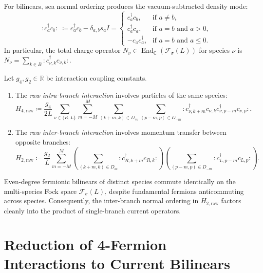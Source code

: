 For bilinears, sea normal ordering produces the vacuum-subtracted density mode:
\begin{equation}
:\! c_a^\dagger c_b \!: \;\coloneqq c_a^\dagger c_b - \delta_{a, b} s_a I = \begin{cases} c_a^\dagger c_b, & \text{if } a \neq b, \\ c_a^\dagger c_a, & \text{if } a = b \text{ and } a > 0, \\ - c_a c_a^\dagger, & \text{if } a = b \text{ and } a \le 0. \end{cases}
\end{equation}
In particular, the total charge operator $N_\nu \in \operatorname{End}_{\mathbb{C}}(\mathcal{F}_\sigma(L))$ for species $\nu$ is $N_\nu = \sum_{k \in B} :\! c_{\nu, k}^\dagger c_{\nu, k} \!:$.

\begin{definition}
Let $g_4, g_2 \in \mathbb{R}$ be interaction coupling constants.
\begin{enumerate}
    \item The \emph{raw intra-branch interaction} involves particles of the same species:
    \begin{equation}
    H_{4, \mathrm{raw}} \coloneqq \frac{g_4}{2L} \sum_{\nu \in \{R, L\}} \sum_{m=-M}^M \sum_{(k+m, k) \in D_m} \sum_{(p-m, p) \in D_{-m}} :\! c_{\nu, k+m}^\dagger c_{\nu, k} c_{\nu, p-m}^\dagger c_{\nu, p} \!:.
    \end{equation}
    \item The \emph{raw inter-branch interaction} involves momentum transfer between opposite branches:
    \begin{equation}
    H_{2, \mathrm{raw}} \coloneqq \frac{g_2}{L} \sum_{m=-M}^M \left( \sum_{(k+m, k) \in D_m} :\! c_{R, k+m}^\dagger c_{R, k} \!: \right) \left( \sum_{(p-m, p) \in D_{-m}} :\! c_{L, p-m}^\dagger c_{L, p} \!: \right).
    \end{equation}
\end{enumerate}
\end{definition}

Even-degree fermionic bilinears of distinct species commute identically on the multi-species Fock space $\mathcal{F}_\sigma(L)$, despite fundamental fermions anticommuting across species. Consequently, the inter-branch normal ordering in $H_{2, \mathrm{raw}}$ factors cleanly into the product of single-branch current operators.

\section{Reduction of 4-Fermion Interactions to Current Bilinears}

